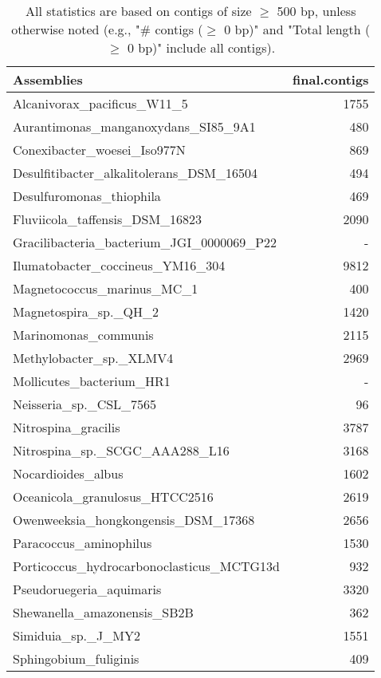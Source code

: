\documentclass[12pt,a4paper]{article}
\begin{document}
\begin{table}[ht]
\begin{center}
\caption{All statistics are based on contigs of size $\geq$ 500 bp, unless otherwise noted (e.g., "\# contigs ($\geq$ 0 bp)" and "Total length ($\geq$ 0 bp)" include all contigs).}
\begin{tabular}{|l*{1}{|r}|}
\hline
Assemblies & final.contigs \\ \hline
Alcanivorax\_pacificus\_W11\_5 & 1755 \\ \hline
Aurantimonas\_manganoxydans\_SI85\_9A1 & 480 \\ \hline
Conexibacter\_woesei\_Iso977N & 869 \\ \hline
Desulfitibacter\_alkalitolerans\_DSM\_16504 & 494 \\ \hline
Desulfuromonas\_thiophila & 469 \\ \hline
Fluviicola\_taffensis\_DSM\_16823 & 2090 \\ \hline
Gracilibacteria\_bacterium\_JGI\_0000069\_P22 & - \\ \hline
Ilumatobacter\_coccineus\_YM16\_304 & 9812 \\ \hline
Magnetococcus\_marinus\_MC\_1 & 400 \\ \hline
Magnetospira\_sp.\_QH\_2 & 1420 \\ \hline
Marinomonas\_communis & 2115 \\ \hline
Methylobacter\_sp.\_XLMV4 & 2969 \\ \hline
Mollicutes\_bacterium\_HR1 & - \\ \hline
Neisseria\_sp.\_CSL\_7565 & 96 \\ \hline
Nitrospina\_gracilis & 3787 \\ \hline
Nitrospina\_sp.\_SCGC\_AAA288\_L16 & 3168 \\ \hline
Nocardioides\_albus & 1602 \\ \hline
Oceanicola\_granulosus\_HTCC2516 & 2619 \\ \hline
Owenweeksia\_hongkongensis\_DSM\_17368 & 2656 \\ \hline
Paracoccus\_aminophilus & 1530 \\ \hline
Porticoccus\_hydrocarbonoclasticus\_MCTG13d & 932 \\ \hline
Pseudoruegeria\_aquimaris & 3320 \\ \hline
Shewanella\_amazonensis\_SB2B & 362 \\ \hline
Simiduia\_sp.\_J\_MY2 & 1551 \\ \hline
Sphingobium\_fuliginis & 409 \\ \hline

\end{tabular}
\end{center}
\end{table}
\end{document}
